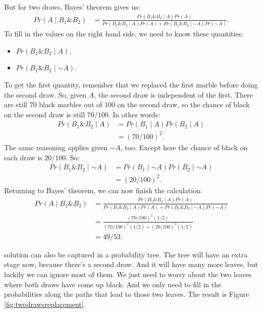 \documentclass[justified]{tufte-book}
\providecommand{\tightlist}{%
  \setlength{\itemsep}{0pt}\setlength{\parskip}{0pt}}
\newcommand{\given}{\mid}
\renewcommand{\neg}{\mathbin{\sim}}
\renewcommand{\wedge}{\mathbin{\&}}
\newcommand{\p}{Pr}
\theoremstyle{definition}
\theoremstyle{definition}
\theoremstyle{definition}
\theoremstyle{definition}
\theoremstyle{remark}
\begin{document}
But for two draws, Bayes' theorem gives us:
\[
  \begin{aligned}
    \p(A \given B_1 \wedge B_2) &= \frac{\p(B_1 \wedge B_2 \given A)\p(A)}{\p(B_1 \wedge B_2 \given A) \p(A) + \p(B_1 \wedge B_2 \given \neg A) \p(\neg A)}.
  \end{aligned}
\]
To fill in the values on the right hand side, we need to know these quantities:

\begin{itemize}
\tightlist
\item
  \(\p(B_1 \wedge B_2 \given A)\),
\item
  \(\p(B_1 \wedge B_2 \given \neg A)\).
\end{itemize}

To get the first quantity, remember that we replaced the first marble before doing the second draw. So, given \(A\), the second draw is independent of the first. There are still \(70\) black marbles out of \(100\) on the second draw, so the chance of black on the second draw is still \(70/100\). In other words:
\[
  \begin{aligned}
    \p(B_1 \wedge B_2 \given A) &= \p(B_1 \given A) \p(B_2 \given A)\\
      &= (70/100)^2.
  \end{aligned}
\]
The same reasoning applies given \(\neg A\), too. Except here the chance of black on each draw is \(20/100\). So:
\[
  \begin{aligned}
    \p(B_1 \wedge B_2 \given \neg A) &= \p(B_1 \given \neg A) \p(B_2 \given \neg A)\\
      &= (20/100)^2.
  \end{aligned}
\]
Returning to Bayes' theorem, we can now finish the calculation:
\[
  \begin{aligned}
    \p(A \given B_1 \wedge B_2) &= \frac{\p(B_1 \wedge B_2 \given A)\p(A)}{\p(B_1 \wedge B_2 \given A) \p(A) + \p(B_1 \wedge B_2 \given \neg A) \p(\neg A)} \\ 
    &= \frac{(70/100)^2(1/2)}{(70/100)^2(1/2) + (20/100)^2(1/2)}\\
    &= 49/53.
  \end{aligned}
\]

 solution can also be captured in a probability tree. The tree will have an extra stage now, because there's a second draw. And it will have many more leaves, but luckily we can ignore most of them. We just need to worry about the two leaves where both draws have come up black. And we only need to fill in the probabilities along the paths that lead to those two leaves. The result is Figure \ref{fig:twodrawsreplacement}.
\end{document}

